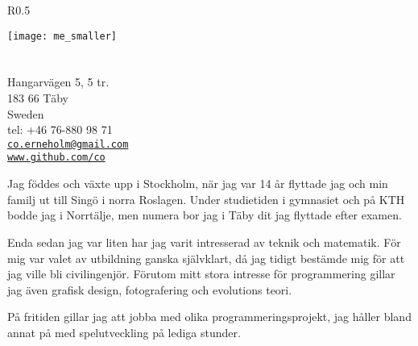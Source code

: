 \documentclass[margin,line]{resume}%
\begin{document}
{\sc \Large {}}%
\begin{resume}
    \vspace{0.5cm}
    \begin{wrapfigure}{R}{0.5\textwidth}
         \vspace{-1cm}
        \begin{center}
        \texttt{[image: me\_smaller]}
        \end{center}
         \vspace{-1cm}
    \end{wrapfigure}

	\section{}\vspace{0.001mm}
	Hangarvägen 5, 5 tr.  \\
	183 66 Täby  \\
	Sweden \\
	tel: +46 76-880 98 71\\
	\href{mailto:co.erneholm@gmail.com}{\texttt{co.erneholm@gmail.com}} \\
	\href{http://www.github.com/co}{\texttt{www.github.com/co}}

	Jag föddes och växte upp i Stockholm, när jag var 14 år flyttade jag
	och min familj ut till Singö i norra Roslagen. Under studietiden i
	gymnasiet och på KTH bodde jag i Norrtälje, men numera bor jag i Täby dit
	jag flyttade efter examen.

	Enda sedan jag var liten har jag varit intresserad av teknik och
	matematik. För mig var valet av utbildning ganska självklart, då
	jag tidigt bestämde mig för att jag ville bli civilingenjör.
	Förutom mitt stora intresse för programmering gillar jag även grafisk
	design, fotografering och evolutions teori.
	
	På fritiden gillar jag att jobba med olika programmeringsprojekt, jag håller
	bland annat på med spelutveckling på lediga stunder.


\end{resume}
\end{document}
